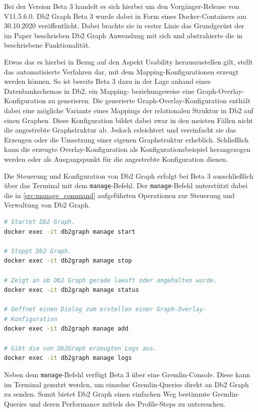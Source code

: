 Bei der Version Beta 3 handelt es sich hierbei um den Vorgänger-Release von V11.5.6.0. Db2 Graph Beta 3 wurde dabei in Form eines Docker-Containers am 30.10.2020 veröffentlicht. Dabei brachte sie in erster Linie das Grundgerüst der im Paper \cite{sigmod_tian} beschrieben Db2 Graph Anwendung mit sich und abstrahierte die in \cite{sigmod_tian} beschriebene Funktionalität. 

Etwas das es hierbei in Bezug auf den Aspekt Usability herauszustellen gilt, stellt das automatisierte Verfahren dar, mit dem Mapping-Konfigurationen erzeugt werden können. So ist bereits Beta 3 dazu in der Lage anhand eines Datenbankschemas in Db2, ein Mapping- beziehungsweise eine Graph-Overlay-Konfiguration zu generieren. Die generierte Graph-Overlay-Konfiguration enthält dabei eine mögliche Variante eines Mappings der relationalen Struktur in Db2 auf einen Graphen. Diese Konfiguration bildet dabei zwar in den meisten Fällen nicht die angestrebte Graphstruktur ab. Jedoch erleichtert und vereinfacht sie das Erzeugen oder die Umsetzung einer eigenen Graphstruktur erheblich. Schließlich kann die erzeugte Overlay-Konfiguration als Konfigurationsbeispiel herangezogen werden oder als Ausgangspunkt für die angestrebte Konfiguration dienen. 

Die Steuerung und Konfiguration von Db2 Graph erfolgt bei Beta 3 ausschließlich über das Terminal mit dem \texttt{manage}-Befehl. Der \texttt{manage}-Befehl unterstützt dabei die in \autoref{src:manage_command} aufgeführten Operationen zur Steuerung und Verwaltung von Db2 Graph. 

\begin{lstlisting}[label=src:manage_command,caption={Beispiel Steuerung und Verwaltung von  Db2 Graph Beta 3},language=BASH]
# Startet Db2 Graph.
docker exec -it db2graph manage start

# Stoppt Db2 Graph.
docker exec -it db2graph manage stop

# Zeigt an ob Db2 Graph gerade laeuft oder angehalten wurde.
docker exec -it db2graph manage status

# Oeffnet einen Dialog zum erstellen einer Graph-Overlay-
# Konfiguration
docker exec -it db2graph manage add

# Gibt die von Db2Graph erzeugten Logs aus.
docker exec -it db2graph manage logs
\end{lstlisting}

Neben dem \texttt{manage}-Befehl verfügt Beta 3 über eine Gremlin-Console. Diese kann im Terminal genutzt werden, um einzelne Gremlin-Queries direkt an Db2 Graph zu senden. Somit bietet Db2 Graph einen einfachen Weg bestimmte Gremlin-Queries und deren Performance mittels des Profile-Steps zu untersuchen.

